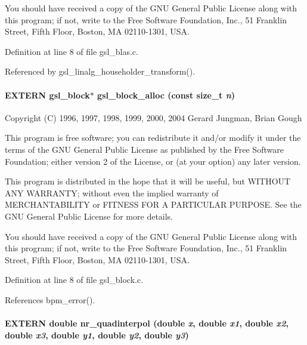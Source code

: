 You should have received a copy of the GNU General Public License along with this program; if not, write to the Free Software Foundation, Inc., 51 Franklin Street, Fifth Floor, Boston, MA 02110-1301, USA. 

Definition at line 8 of file gsl\_\-blas.c.

Referenced by gsl\_\-linalg\_\-householder\_\-transform().
\paragraph[gsl\_\-block\_\-alloc]{\setlength{\rightskip}{0pt plus 5cm}EXTERN gsl\_\-block$\ast$ gsl\_\-block\_\-alloc (const size\_\-t {\em n})}\hfill\label{group__nr_ge18644f0160921b317abbf56f6c7db67}




Copyright (C) 1996, 1997, 1998, 1999, 2000, 2004 Gerard Jungman, Brian Gough

This program is free software; you can redistribute it and/or modify it under the terms of the GNU General Public License as published by the Free Software Foundation; either version 2 of the License, or (at your option) any later version.

This program is distributed in the hope that it will be useful, but WITHOUT ANY WARRANTY; without even the implied warranty of MERCHANTABILITY or FITNESS FOR A PARTICULAR PURPOSE. See the GNU General Public License for more details.

You should have received a copy of the GNU General Public License along with this program; if not, write to the Free Software Foundation, Inc., 51 Franklin Street, Fifth Floor, Boston, MA 02110-1301, USA. 

Definition at line 8 of file gsl\_\-block.c.

References bpm\_\-error().
\paragraph[nr\_\-quadinterpol]{\setlength{\rightskip}{0pt plus 5cm}EXTERN double nr\_\-quadinterpol (double {\em x}, \/  double {\em x1}, \/  double {\em x2}, \/  double {\em x3}, \/  double {\em y1}, \/  double {\em y2}, \/  double {\em y3})}\hfill\label{group__nr_g9c6d3ac37fd3c43b8eab6c7e3e527f8a}


